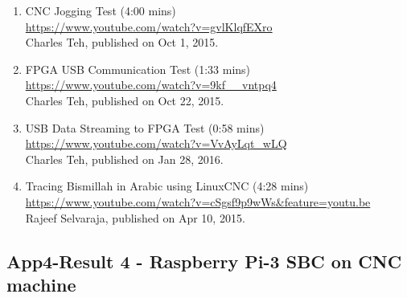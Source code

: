 \begin{enumerate}
	\item CNC Jogging Test (4:00 mins)\\ 
		\url{https://www.youtube.com/watch?v=gvlKlqfEXro}\\
		Charles Teh, published on Oct 1, 2015.
		
	\item FPGA USB Communication Test (1:33 mins)\\
		\url{https://www.youtube.com/watch?v=9kf__vntpq4}\\
		Charles Teh, published on Oct 22, 2015.
		
	\item USB Data Streaming to FPGA Test (0:58 mins)\\
		\url{https://www.youtube.com/watch?v=VvAyLqt_wLQ}\\
		Charles Teh, published on Jan 28, 2016.
		
	\item Tracing Bismillah in Arabic using LinuxCNC (4:28 mins)\\
		\url{https://www.youtube.com/watch?v=cSgsf9p9wWs&feature=youtu.be}\\
		Rajeef Selvaraja, published on Apr 10, 2015.	

\end{enumerate}

\pagebreak
\subsection{App4-Result 4 - Raspberry Pi-3 SBC on CNC machine}

